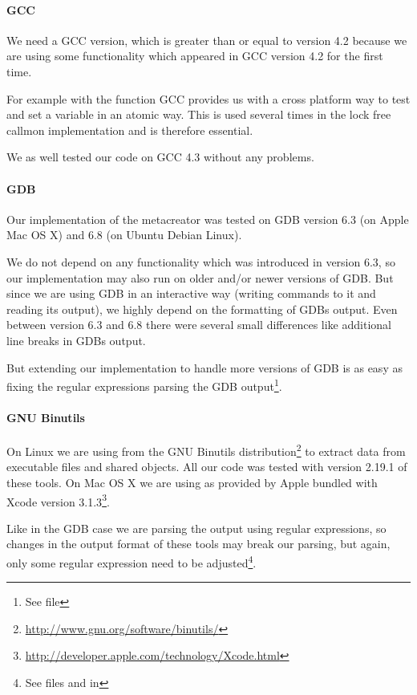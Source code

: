 \paragraph{GCC} We need a GCC version, which is greater than or equal to version 4.2 because we are using some functionality which appeared in GCC version 4.2 for the first time.

For example with the function  GCC provides us with a cross platform way to test and set a variable in an atomic way. This is used several times in the lock free callmon implementation and is therefore essential.

We as well tested our code on GCC 4.3 without any problems.

\paragraph{GDB}

Our implementation of the metacreator was tested on GDB version 6.3 (on Apple Mac OS X) and 6.8 (on Ubuntu Debian Linux).

We do not depend on any functionality which was introduced in version 6.3, so our implementation may also run on older and/or newer versions of GDB. But since we are using GDB in an interactive way (writing commands to it and reading its output), we highly depend on the formatting of GDBs output. Even between version 6.3 and 6.8 there were several small differences like additional line breaks in GDBs output.

But extending our implementation to handle more versions of GDB is as easy as fixing the regular expressions parsing the GDB output\footnote{See file }.

\paragraph{GNU Binutils}

On Linux we are using  from the GNU Binutils distribution\footnote{\url{http://www.gnu.org/software/binutils/}} to extract data from executable files and shared objects.
All our code was tested with version 2.19.1 of these tools.  On Mac OS X we are using  as provided by Apple bundled with Xcode version 3.1.3\footnote{\url{http://developer.apple.com/technology/Xcode.html}}.

Like in the GDB case we are parsing the output using regular expressions, so changes in the output format of these tools may break our parsing, but again, only some regular expression need to be adjusted\footnote{See files
 and  in }.

